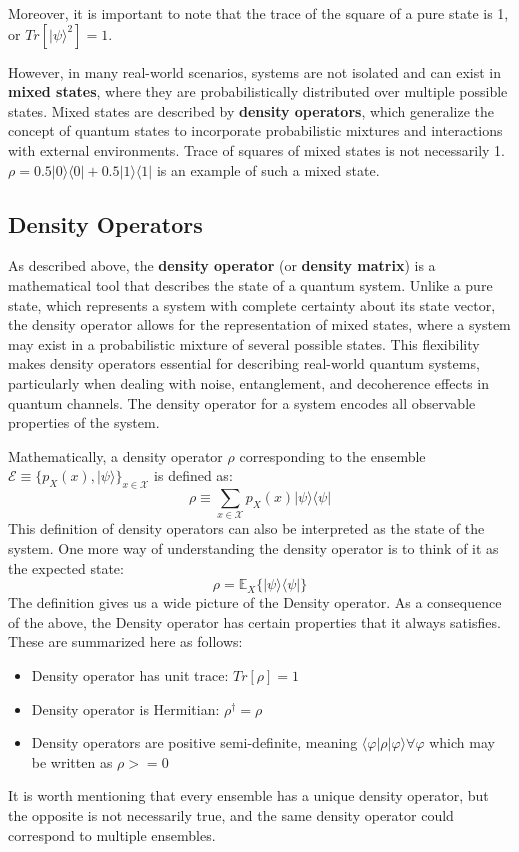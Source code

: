 Moreover, it is important to note that the trace of the square of a pure state is 1, or
$Tr[| \psi \rangle^2] = 1$.

However, in many real-world scenarios, systems are not isolated and can exist in \textbf{mixed states},
where they are probabilistically distributed over multiple possible states. Mixed states are described
by \textbf{density operators}, which generalize the concept of quantum states to incorporate
probabilistic mixtures and interactions with external environments. Trace of squares of mixed states is
not necessarily 1. $\rho = 0.5 |0 \rangle \langle 0| + 0.5 |1 \rangle \langle 1|$ is an example of such
a mixed state.

\subsection{Density Operators}

As described above, the \textbf{density operator} (or \textbf{density matrix})
is a mathematical tool that describes the state of a quantum system. Unlike a pure state, which
represents a system with complete certainty about its state vector, the density operator allows
for the representation of mixed states, where a system may exist in a probabilistic mixture of
several possible states. This flexibility makes density operators essential for describing
real-world quantum systems, particularly when dealing with noise, entanglement, and decoherence
effects in quantum channels. The density operator for a system encodes all observable properties
of the system.

Mathematically, a density operator $\rho$ corresponding to the ensemble $\mathcal{E} \equiv
\{p_X(x), |\psi\rangle \}_{x \in \mathcal{X}}$ is defined as:
\begin{equation}
    \rho \equiv \displaystyle\sum_{x \in \mathcal{X} } p_X(x) |\psi \rangle \langle \psi|
\end{equation}
This definition of density operators can also be interpreted as the state of the system. One
more way of understanding the density operator is to think of it as the expected state:
\begin{equation}
    \rho = \mathbb{E}_X \{ |\psi \rangle \langle \psi| \}
\end{equation}
The definition gives us a wide picture of the Density operator. As a consequence of the above,
the Density operator has certain properties that it always satisfies. These are summarized here
as follows:
\begin{itemize}
    \item Density operator has unit trace: $Tr[\rho] = 1$
    \item Density operator is Hermitian: $\rho^\dagger = \rho$
    \item Density operators are positive semi-definite, meaning $\langle \varphi  | \rho | \varphi \rangle
    \forall \varphi$ which may be written as $\rho >= 0$
\end{itemize}
It is worth mentioning that every ensemble has a unique density operator, but the opposite
is not necessarily true, and the same density operator could correspond to multiple ensembles.

